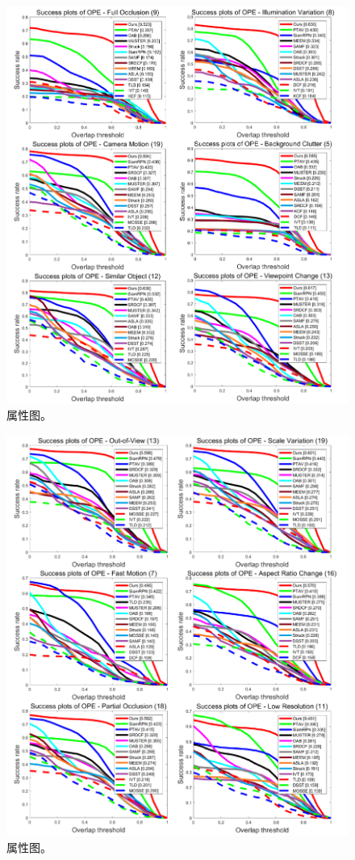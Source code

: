 \begin{figure}[t]
    \centering
    \includegraphics[width=1.0\textwidth]{Img/end/UAV20L_1.pdf}
    \caption{属性图。}
\end{figure}
\begin{figure}[t]
    \centering
    \includegraphics[width=1.0\textwidth]{Img/end/UAV20L_2.pdf}
    \caption{属性图。}
\end{figure}


